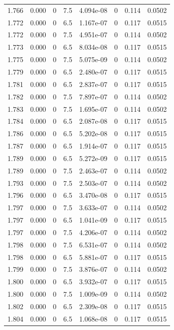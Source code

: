 \documentclass[preview]{standalone}
\begin{document}
{{{{{{{{{{{{{{{{{{{{\begin{tabular}{L{1.2cm}C{1.2cm} C{0.3cm}C{0.5cm} C{1.4cm}C{1.4cm} C{1.4cm}C{1.4cm}}
  1.766  &  0.000  & 0     & 7.5 &  4.094e-08  & 0  & 0.114 &  0.0502   \\ 
  1.772  &  0.000  & 0     & 6.5 &  1.167e-07  & 0  & 0.117 &  0.0515   \\ 
  1.772  &  0.000  & 0     & 7.5 &  4.951e-07  & 0  & 0.114 &  0.0502   \\ 
  1.773  &  0.000  & 0     & 6.5 &  8.034e-08  & 0  & 0.117 &  0.0515   \\ 
  1.775  &  0.000  & 0     & 7.5 &  5.075e-09  & 0  & 0.114 &  0.0502   \\ 
  1.779  &  0.000  & 0     & 6.5 &  2.480e-07  & 0  & 0.117 &  0.0515   \\ 
  1.781  &  0.000  & 0     & 6.5 &  2.837e-07  & 0  & 0.117 &  0.0515   \\ 
  1.782  &  0.000  & 0     & 7.5 &  7.897e-07  & 0  & 0.114 &  0.0502   \\ 
  1.783  &  0.000  & 0     & 7.5 &  1.695e-07  & 0  & 0.114 &  0.0502   \\ 
  1.784  &  0.000  & 0     & 6.5 &  2.087e-08  & 0  & 0.117 &  0.0515   \\ 
  1.786  &  0.000  & 0     & 6.5 &  5.202e-08  & 0  & 0.117 &  0.0515   \\ 
  1.787  &  0.000  & 0     & 6.5 &  1.914e-07  & 0  & 0.117 &  0.0515   \\ 
  1.789  &  0.000  & 0     & 6.5 &  5.272e-09  & 0  & 0.117 &  0.0515   \\ 
  1.789  &  0.000  & 0     & 7.5 &  2.463e-07  & 0  & 0.114 &  0.0502   \\ 
  1.793  &  0.000  & 0     & 7.5 &  2.503e-07  & 0  & 0.114 &  0.0502   \\ 
  1.796  &  0.000  & 0     & 6.5 &  3.470e-08  & 0  & 0.117 &  0.0515   \\ 
  1.797  &  0.000  & 0     & 7.5 &  3.633e-07  & 0  & 0.114 &  0.0502   \\ 
  1.797  &  0.000  & 0     & 6.5 &  1.041e-09  & 0  & 0.117 &  0.0515   \\ 
  1.797  &  0.000  & 0     & 7.5 &  4.206e-07  & 0  & 0.114 &  0.0502   \\ 
  1.798  &  0.000  & 0     & 7.5 &  6.531e-07  & 0  & 0.114 &  0.0502   \\ 
  1.798  &  0.000  & 0     & 6.5 &  5.881e-07  & 0  & 0.117 &  0.0515   \\ 
  1.799  &  0.000  & 0     & 7.5 &  3.876e-07  & 0  & 0.114 &  0.0502   \\ 
  1.800  &  0.000  & 0     & 6.5 &  3.932e-07  & 0  & 0.117 &  0.0515   \\ 
  1.800  &  0.000  & 0     & 7.5 &  1.009e-09  & 0  & 0.114 &  0.0502   \\ 
  1.802  &  0.000  & 0     & 6.5 &  2.309e-08  & 0  & 0.117 &  0.0515   \\ 
  1.804  &  0.000  & 0     & 6.5 &  1.068e-08  & 0  & 0.117 &  0.0515   \\ 
\hline 
\end{tabular} 

}}}}}}}}}}}}}}}}}}}}
\end{document}
